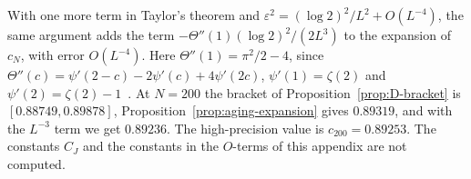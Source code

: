 With one more term in Taylor's theorem and
$\varepsilon^2=(\log2)^2/L^2+O(L^{-4})$, the same argument adds the term
$-\Theta''(1)(\log2)^2/(2L^3)$ to the expansion of $c_N$, with error
$O(L^{-4})$. Here $\Theta''(1)=\pi^2/2-4$, since
$\Theta''(c)=\psi'(2-c)-2\psi'(c)+4\psi'(2c)$, $\psi'(1)=\zeta(2)$ and
$\psi'(2)=\zeta(2)-1$~\cite[5.4.12, 5.15.5]{dlmf}. At $N=200$ the bracket of
Proposition~\ref{prop:D-bracket} is $[0.88749,0.89878]$,
Proposition~\ref{prop:aging-expansion} gives $0.89319$, and with the $L^{-3}$
term we get $0.89236$. The high-precision value is $c_{200}=0.89253$. The
constants $C_J$ and the constants in the $O$-terms of this appendix are not
computed.

